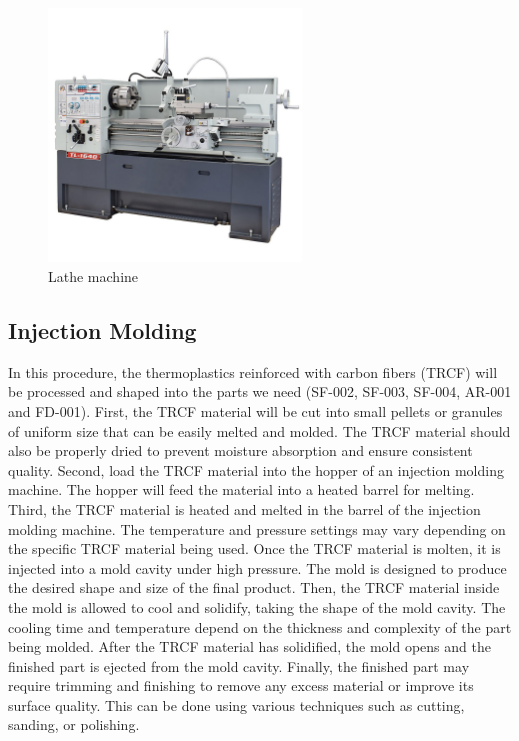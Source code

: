 \begin{figure}[!htp]
    \centering
    \includegraphics[width=0.6\textwidth]{images/lathe.jpg}
    \caption{Lathe machine}
    \label{fig: lathe}
\end{figure}

\subsection{Injection Molding}
In this procedure, the thermoplastics reinforced with carbon fibers (TRCF) will be processed and shaped into the parts we need (SF-002, SF-003, SF-004, AR-001 and FD-001). First, the TRCF material will be cut into small pellets or granules of uniform size that can be easily melted and molded. The TRCF material should also be properly dried to prevent moisture absorption and ensure consistent quality. Second, load the TRCF material into the hopper of an injection molding machine. The hopper will feed the material into a heated barrel for melting. Third, the TRCF material is heated and melted in the barrel of the injection molding machine. The temperature and pressure settings may vary depending on the specific TRCF material being used. Once the TRCF material is molten, it is injected into a mold cavity under high pressure. The mold is designed to produce the desired shape and size of the final product. Then, the TRCF material inside the mold is allowed to cool and solidify, taking the shape of the mold cavity. The cooling time and temperature depend on the thickness and complexity of the part being molded. After the TRCF material has solidified, the mold opens and the finished part is ejected from the mold cavity. Finally, the finished part may require trimming and finishing to remove any excess material or improve its surface quality. This can be done using various techniques such as cutting, sanding, or polishing.

